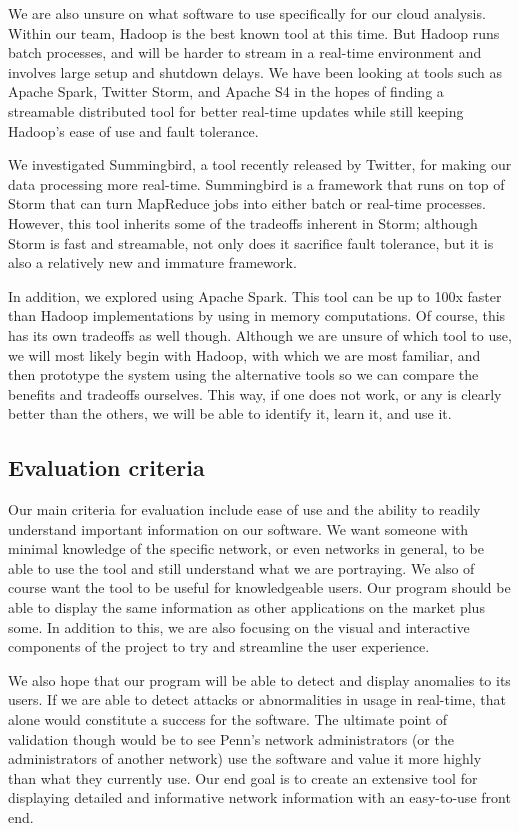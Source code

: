 \documentclass{sig-alternate}
\begin{document}
We are also unsure on what software to use specifically for our cloud analysis.
Within our team, Hadoop is the best known tool at this time. But Hadoop runs
batch processes, and will be harder to stream in a real-time environment and
involves large setup and shutdown delays. We have been looking at tools such as
Apache Spark, Twitter Storm, and Apache S4 in the hopes of finding a streamable
distributed tool for better real-time updates while still keeping Hadoop's ease
of use and fault tolerance.

We investigated Summingbird, a tool recently released by Twitter, for making our
data processing more real-time. Summingbird is a framework that runs on top of
Storm that can turn MapReduce jobs into either batch or real-time processes.
However, this tool inherits some of the tradeoffs inherent in Storm; although
Storm is fast and streamable, not only does it sacrifice fault tolerance, but it
is also a relatively new and immature framework.\cite{TwitterSummingbird}

In addition, we explored using Apache Spark. This tool can be up to 100x faster
than Hadoop implementations by using in memory computations. Of course, this has
its own tradeoffs as well though.\cite{ApacheSpark} Although we are unsure of
which tool to use, we will most likely begin with Hadoop, with which we are most
familiar, and then prototype the system using the alternative tools so we can
compare the benefits and tradeoffs ourselves. This way, if one does not work, or
any is clearly better than the others, we will be able to identify it, learn it,
and use it.

\subsection{Evaluation criteria}

Our main criteria for evaluation include ease of use and the ability to readily
understand important information on our software. We want someone with minimal
knowledge of the specific network, or even networks in general, to be able to
use the tool and still understand what we are portraying. We also of course want
the tool to be useful for knowledgeable users. Our program should be able to
display the same information as other applications on the market plus some. In
addition to this, we are also focusing on the visual and interactive components
of the project to try and streamline the user experience.

We also hope that our program will be able to detect and display anomalies to
its users. If we are able to detect attacks or abnormalities in usage in
real-time, that alone would constitute a success for the software. The ultimate
point of validation though would be to see Penn's network administrators (or the
administrators of another network) use the software and value it more highly
than what they currently use. Our end goal is to create an extensive tool for
displaying detailed and informative network information with an easy-to-use
front end.
\end{document}
